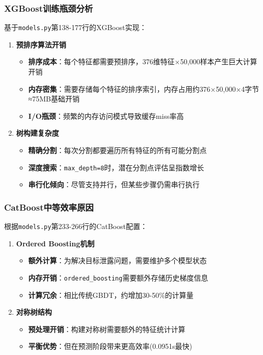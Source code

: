 \documentclass[UTF8]{report}
\theoremstyle{MyLineTheoremStyle} %
\theoremstyle{MyBlockTheoremStyle} %
\theoremstyle{MySubsubsectionStyle} %
\begin{document}
\subsubsection{XGBoost训练瓶颈分析}
基于\texttt{models.py}第138-177行的XGBoost实现：
\begin{enumerate}
    \item \textbf{预排序算法开销}
    \begin{itemize}
        \item \textbf{排序成本}：每个特征都需要预排序，376维特征×50,000样本产生巨大计算开销
        \item \textbf{内存密集}：需要存储每个特征的排序索引，内存占用约376×50,000×4字节≈75MB基础开销
        \item \textbf{I/O瓶颈}：频繁的内存访问模式导致缓存miss率高
    \end{itemize}
    \item \textbf{树构建复杂度}
    \begin{itemize}
        \item \textbf{精确分割}：每次分割都要遍历所有特征的所有可能分割点
        \item \textbf{深度搜索}：\texttt{max\_depth=8}时，潜在分割点评估呈指数增长
        \item \textbf{串行化倾向}：尽管支持并行，但某些步骤仍需串行执行
    \end{itemize}
\end{enumerate}

\subsubsection{CatBoost中等效率原因}
根据\texttt{models.py}第233-266行的CatBoost配置：
\begin{enumerate}
    \item \textbf{Ordered Boosting机制}
    \begin{itemize}
        \item \textbf{额外计算}：为解决目标泄露问题，需要维护多个模型状态
        \item \textbf{内存开销}：\texttt{ordered\_boosting}需要额外存储历史梯度信息
        \item \textbf{计算冗余}：相比传统GBDT，约增加30-50\%的计算量
    \end{itemize}
    \item \textbf{对称树结构}
    \begin{itemize}
        \item \textbf{预处理开销}：构建对称树需要额外的特征统计计算
        \item \textbf{平衡优势}：但在预测阶段带来更高效率(0.0951s最快)
    \end{itemize}
\end{enumerate}
\end{document}
